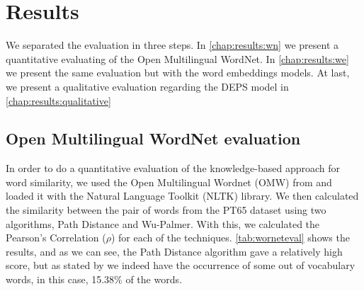 \section{Results}\label{chap:results}


We separated the evaluation in three steps. In \autoref{chap:results:wn} we present a quantitative evaluating of the Open Multilingual WordNet. In \autoref{chap:results:we} we present the same evaluation but with the word embeddings models. At last, we present a qualitative evaluation regarding the DEPS model in \autoref{chap:results:qualitative}



\subsection{Open Multilingual WordNet evaluation}\label{chap:results:wn}

In order to do a quantitative evaluation of the knowledge-based approach for word similarity, we used the Open Multilingual Wordnet (OMW) from  and loaded it with the Natural Language Toolkit (NLTK) library. We then calculated the similarity between the pair of words from the PT65 dataset using two algorithms, Path Distance and Wu-Palmer. With this, we calculated the Pearson’s Correlation ($\rho$) for each of the techniques.
\autoref{tab:worneteval} shows the results, and as we can see, the Path Distance algorithm gave a relatively high score, but as stated by  we indeed have the occurrence of some out of vocabulary words, in this case, 15.38\% of the words.



